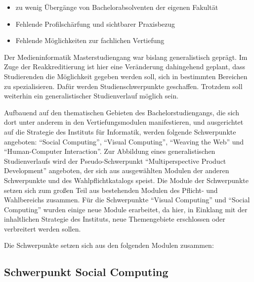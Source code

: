 \begin{itemize}
\tightlist
\item
  zu wenig Übergänge von Bachelorabsolventen der eigenen Fakultät
\item
  Fehlende Profilschärfung und sichtbarer Praxisbezug
\item
  Fehlende Möglichkeiten zur fachlichen Vertiefung
\end{itemize}

Der Medieninformatik Masterstudiengang war bislang generalistisch
geprägt. Im Zuge der Reakkreditierung ist hier eine Veränderung
dahingehend geplant, dass Studierenden die Möglichkeit gegeben werden
soll, sich in bestimmten Bereichen zu spezialisieren. Dafür werden
Studienschwerpunkte geschaffen. Trotzdem soll weiterhin ein
generalistischer Studienverlauf möglich sein.

Aufbauend auf den thematischen Gebieten des Bachelorstudiengangs, die
sich dort unter anderem in den Vertiefungsmodulen manifestieren, und
ausgerichtet auf die Strategie des Instituts für Informatik, werden
folgende Schwerpunkte angeboten: ``Social Computing'', ``Visual
Computing'', ``Weaving the Web'' und ``Human-Computer Interaction''. Zur
Abbildung eines generalistischen Studienverlaufs wird der
Pseudo-Schwerpunkt ``Multiperspective Product Development'' angeboten,
der sich aus ausgewählten Modulen der anderen Schwerpunkte und des
Wahlpflichtkatalogs speist. Die Module der Schwerpunkte setzen sich zum
großen Teil aus bestehenden Modulen des Pflicht- und Wahlbereichs
zusammen. Für die Schwerpunkte ``Visual Computing'' und ``Social
Computing'' wurden einige neue Module erarbeitet, da hier, in Einklang
mit der inhaltlichen Strategie des Instituts, neue Themengebiete
erschlossen oder verbreitert werden sollen.

Die Schwerpunkte setzen sich aus den folgenden Modulen zusammen:

\subsection{Schwerpunkt Social
Computing}\label{schwerpunkt-social-computing}

